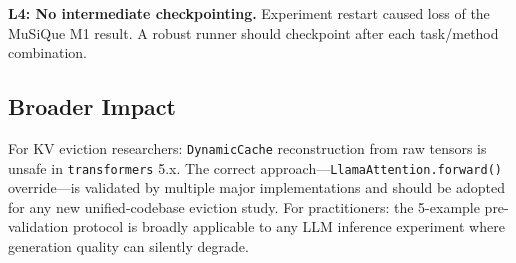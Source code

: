 \textbf{L4: No intermediate checkpointing.} Experiment restart caused loss of the MuSiQue M1 result. A robust runner should checkpoint after each task/method combination.

\subsection{Broader Impact}

For KV eviction researchers: \texttt{DynamicCache} reconstruction from raw tensors is unsafe in \texttt{transformers} 5.x. The correct approach---\texttt{LlamaAttention.forward()} override---is validated by multiple major implementations and should be adopted for any new unified-codebase eviction study. For practitioners: the 5-example pre-validation protocol is broadly applicable to any LLM inference experiment where generation quality can silently degrade.
